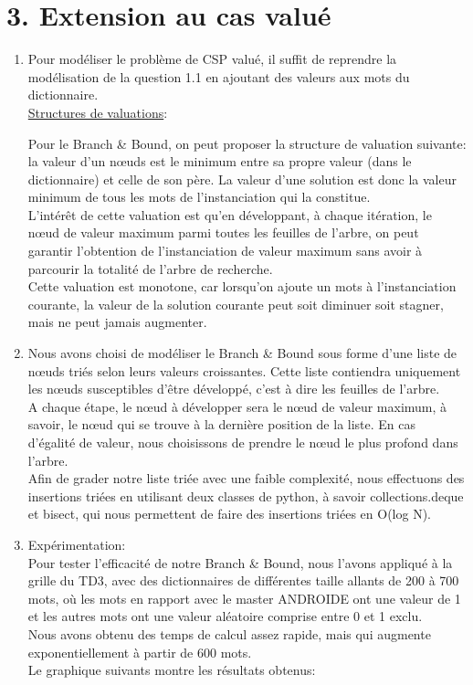 \documentclass[a4paper,12pt]{report}
\begin{document}
\section*{3. Extension au cas valué}

\begin{enumerate}

\item Pour modéliser le problème de CSP valué, il suffit de reprendre la modélisation de la question 1.1 en ajoutant des valeurs aux mots du dictionnaire.\\

\ul{Structures de valuations}: 

Pour le Branch \& Bound, on peut proposer la structure de valuation suivante: la valeur d'un nœuds est le minimum entre sa propre valeur (dans le dictionnaire) et celle de son père. La valeur d'une solution est donc la valeur minimum de tous les mots de l'instanciation qui la constitue.\\
L'intérêt de cette valuation est qu'en développant, à chaque itération, le nœud de valeur maximum parmi toutes les feuilles de l'arbre, on peut garantir l'obtention de l'instanciation de valeur maximum sans avoir à parcourir la totalité de l'arbre de recherche.\\
Cette valuation est monotone, car lorsqu'on ajoute un mots à l'instanciation courante, la valeur de la solution courante peut soit diminuer soit stagner, mais ne peut jamais augmenter.\\

\item Nous avons choisi de modéliser le Branch \& Bound sous forme d'une liste de nœuds triés selon leurs valeurs croissantes. Cette liste contiendra uniquement les nœuds susceptibles d'être développé, c'est à dire les feuilles de l'arbre.  \\

A chaque étape, le nœud à développer sera le nœud de valeur maximum, à savoir, le nœud qui se trouve à la dernière position de la liste. En cas d'égalité de valeur, nous choisissons de prendre le nœud le plus profond dans l'arbre.\\
Afin de grader notre liste triée avec une faible complexité, nous effectuons des insertions triées en utilisant deux classes de python, à savoir collections.deque et bisect, qui nous permettent de faire des insertions triées en O(log N).\\

\item Expérimentation: \\
Pour tester l'efficacité de notre Branch \& Bound, nous l'avons appliqué à la grille du TD3, avec des dictionnaires de différentes taille allants de 200 à 700 mots, où les mots en rapport avec le master ANDROIDE ont une valeur de 1 et les autres mots ont une valeur aléatoire comprise entre 0 et 1 exclu.\\
Nous avons obtenu des temps de calcul assez rapide, mais qui augmente exponentiellement à partir de 600 mots.\\
Le graphique suivants montre les résultats obtenus:



\end{enumerate}
\end{document}
